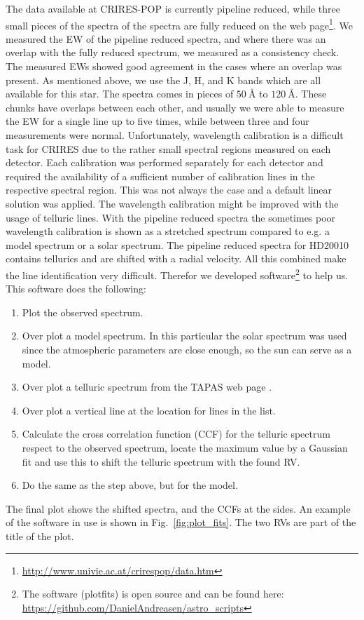 \documentclass{aa}
\begin{document}
The data available at CRIRES-POP is currently pipeline reduced, while
three small pieces of the spectra of the spectra are fully reduced on
the web page\footnote{\url{http://www.univie.ac.at/crirespop/data.htm}}.
We measured the EW of the pipeline reduced spectra, and where there
was an overlap with the fully reduced spectrum, we measured as a
consistency check. The measured EWs showed good agreement in the cases
where an overlap was present. As mentioned above, we use the J, H,
and K bands which are all available for this star. The spectra comes
in pieces of $\SI{50}{\angstrom}$ to $\SI{120}{\angstrom}$. These
chunks have overlaps between each other, and usually we were able
to measure the EW for a single line up to five times, while between
three and four measurements were normal. Unfortunately, wavelength
calibration is a difficult task for CRIRES due to the rather small
spectral regions measured on each detector. Each calibration was
performed separately for each detector and required the availability
of a sufficient number of calibration lines in the respective spectral
region. This was not always the case and a default linear solution
was applied. The wavelength calibration might be improved with the
usage of telluric lines. With the pipeline reduced spectra the
sometimes poor wavelength calibration is shown as a stretched spectrum
compared to e.g. a model spectrum or a solar spectrum. The pipeline
reduced spectra for HD20010 contains tellurics and are shifted with
a radial velocity. All this combined make the line identification
very difficult. Therefor we developed software\footnote{The software
(plot\textunderscore{}fits) is open source and can be found here:
\url{https://github.com/DanielAndreasen/astro_scripts}} to help us. This
software does the following:
\begin{enumerate}
    \item Plot the observed spectrum.
    \item Over plot a model spectrum. In this particular the solar spectrum was
        used since the atmospheric parameters are close enough, so the sun can
        serve as a model.
    \item Over plot a telluric spectrum from the TAPAS web page \citep{Bertaux2014}.
    \item Over plot a vertical line at the location for lines in the list.
    \item Calculate the cross correlation function (CCF) for the telluric spectrum
        respect to the observed spectrum, locate the maximum value by a Gaussian fit
        and use this to shift the telluric spectrum with the found RV.
    \item Do the same as the step above, but for the model.
\end{enumerate}
The final plot shows the shifted spectra, and the CCFs at the sides. An
example of the software in use is shown in Fig.~\ref{fig:plot_fits}. The
two RVs are part of the title of the plot.
\end{document}
